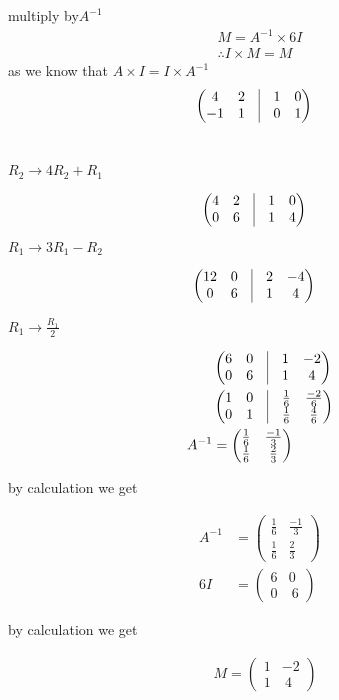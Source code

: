 \documentclass[journal,12pt,twocolumn]{IEEEtran}
\newcommand{\myvec}[1]{\ensuremath{\begin{pmatrix}#1\end{pmatrix}}}
\begin{document}
 \centering multiply by\hspace{3mm}$ A^{-1}$
 \begin{align}  
    \nonumber M=A^{-1}\times 6I\\  \therefore I\times M=M
    \end{align}
    as we know that  $A \times I=I\times A^{-1}$
   	\begin{align}
   	&\myvec{4 &2 & \vrule &1&0\\ -1&1&\vrule&0&1}
	\end{align}\\ 
 \begin{flushleft}
 $R_2\rightarrow 4R_2+R_1$
 \end{flushleft}
\begin{align}
	&\myvec{4 &2 & \vrule &1&0\\ 0&6&\vrule&1&4}
\end{align}
\begin{flushleft}
	$R_1\rightarrow 3R_1-R_2$
\end{flushleft}
\begin{align}
	 &\myvec{12&0& \vrule &2&-4\\0&6&\vrule&1&4}
\end{align}
\begin{flushleft}
$R_1\rightarrow \frac{R_1}{2}$
\end{flushleft}
\begin{align*}
&\myvec{6 &0 & \vrule &1&-2\\ 0&6&\vrule&1&4}\\*
&\myvec{1 &0 & \vrule&\frac{1}{6}&\frac{-2}{6}\\ 0&1&\vrule&\frac{1}{6}&\frac{4}{6}}\\
  A^{-1}&=\myvec{
      \frac{1}{6} & \frac{-1}{3}\\
    \frac{1}{6} & \frac{2}{3}
     }
\end{align*}
\begin{flushleft}
   by calculation we get
   \end{flushleft}   
 \begin{align}
 A^{-1}&=\myvec{
      \frac{1}{6} & \frac{-1}{3}\\
    \frac{1}{6} & \frac{2}{3}
     }\\
     6I&=\myvec{
    6&0 \\
    0 & \ 6
     }
 \end{align}    
\begin{flushleft}
by calculation we get 
\end{flushleft}
 \begin{align}
  &M=\myvec{
    1&-2 \\
    1 & \ 4
     }
 \end{align}   
\end{document}
